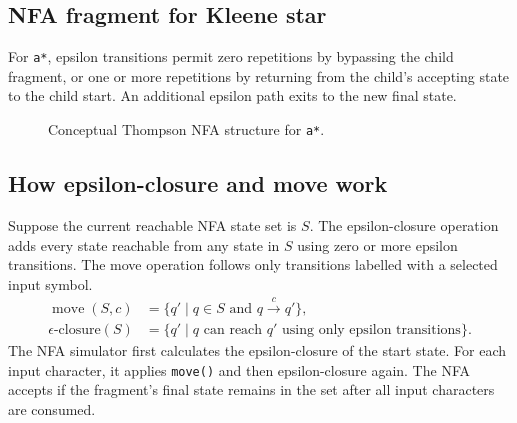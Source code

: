 \documentclass[12pt,a4paper]{report}
\begin{document}
\subsection{NFA fragment for Kleene star}
For \texttt{a*}, epsilon transitions permit zero repetitions by bypassing the child fragment, or one or more repetitions by returning from the child's accepting state to the child start. An additional epsilon path exits to the new final state.
\begin{figure}[H]
\centering
{}
\caption{Conceptual Thompson NFA structure for \texttt{a*}.}
\label{fig:nfa-star}
\end{figure}

\subsection{How epsilon-closure and move work}
Suppose the current reachable NFA state set is $S$. The epsilon-closure operation adds every state reachable from any state in $S$ using zero or more epsilon transitions. The move operation follows only transitions labelled with a selected input symbol.
\begin{align*}
\operatorname{move}(S,c) &= \{q'\mid q\in S\text{ and }q\xrightarrow{c}q'\},\\
\epsilon\text{-closure}(S) &= \{q'\mid q\text{ can reach }q'\text{ using only epsilon transitions}\}.
\end{align*}
The NFA simulator first calculates the epsilon-closure of the start state. For each input character, it applies \texttt{move()} and then epsilon-closure again. The NFA accepts if the fragment's final state remains in the set after all input characters are consumed.
\end{document}
